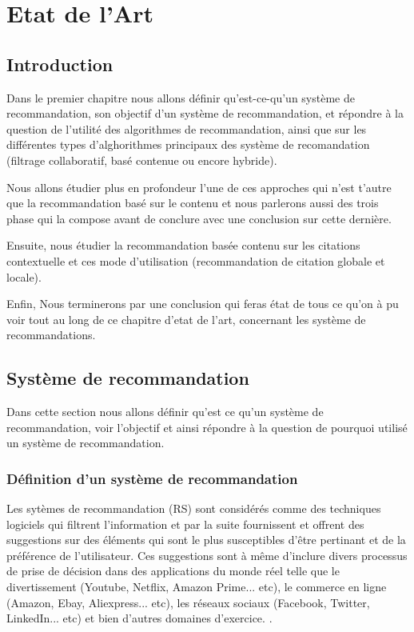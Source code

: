 \chapter{\textbf{Etat de l'Art}} \label{chapitre1}

\section{Introduction}


\par Dans le premier chapitre nous allons définir qu'est-ce-qu'un système de recommandation, son objectif d'un système de recommandation, et répondre à la question  de l'utilité des algorithmes de recommandation, ainsi que sur les différentes types d'alghorithmes principaux des système de recomandation (filtrage collaboratif, basé contenue ou encore hybride). 

\par Nous allons étudier plus en profondeur l'une de ces approches qui n'est t'autre que la recommandation basé sur le contenu et nous parlerons aussi des trois phase qui la compose avant de conclure avec une conclusion sur cette dernière. 

\par Ensuite, nous étudier la recommandation basée contenu sur les citations contextuelle et ces mode d'utilisation (recommandation de citation globale et locale).

\par Enfin, Nous terminerons par une conclusion qui feras état de tous ce qu'on à pu voir tout au long de ce chapitre d'etat de l'art, concernant les système de recommandations.


\section{Système de recommandation}
\par Dans cette section nous allons définir qu'est ce qu'un système de recommandation, voir l'objectif et ainsi répondre à la question de pourquoi utilisé un système de recommandation.


    \subsection{Définition d’un système de recommandation}
    \par Les sytèmes de recommandation (RS) sont considérés comme des techniques logiciels qui filtrent l’information et par la suite fournissent et offrent des suggestions sur des éléments qui sont le plus susceptibles d'être pertinant et de la préférence de l'utilisateur. Ces suggestions sont à même d'inclure divers processus de prise de décision dans des applications du monde réel telle que le divertissement (Youtube, Netflix, Amazon Prime... etc), le commerce en ligne (Amazon, Ebay, Aliexpress... etc), les réseaux sociaux (Facebook, Twitter, LinkedIn... etc) et bien d'autres domaines d'exercice. \cite{ch1ref7}.
    
